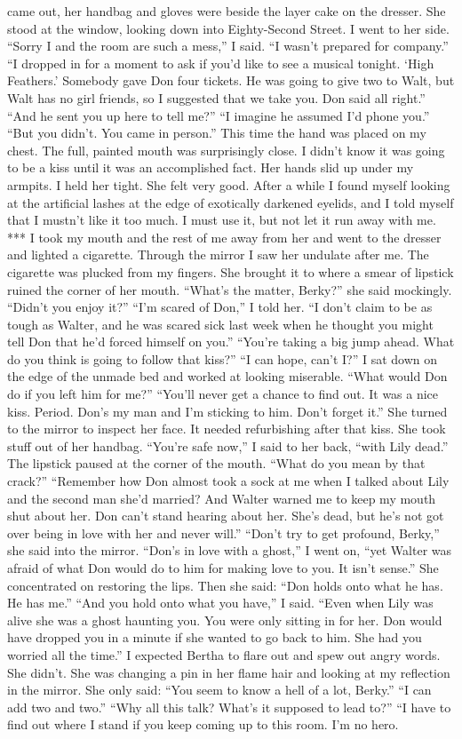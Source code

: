 \documentclass{novel}
\begin{document}
came out, her handbag and gloves were beside the layer cake on the dresser. She stood at the window, looking down into Eighty-Second Street. I went to her side. “Sorry I and the room are such a mess,” I said. “I wasn’t prepared for company.” “I dropped in for a moment to ask if you’d like to see a musical tonight. ‘High Feathers.’ Somebody gave Don four tickets. He was going to give two to Walt, but Walt has no girl friends, so I suggested that we take you. Don said all right.” “And he sent you up here to tell me?” “I imagine he assumed I’d phone you.” “But you didn’t. You came in person.” This time the hand was placed on my chest. The full, painted mouth was surprisingly close. I didn’t know it was going to be a kiss until it was an accomplished fact. Her hands slid up under my armpits. I held her tight. She felt very good. After a while I found myself looking at the artificial lashes at the edge of exotically darkened eyelids, and I told myself that I mustn’t like it too much. I must use it, but not let it run away with me. *** I took my mouth and the rest of me away from her and went to the dresser and lighted a cigarette. Through the mirror I saw her undulate after me. The cigarette was plucked from my fingers. She brought it to where a smear of lipstick ruined the corner of her mouth. “What’s the matter, Berky?” she said mockingly. “Didn’t you enjoy it?” “I’m scared of Don,” I told her. “I don’t claim to be as tough as Walter, and he was scared sick last week when he thought you might tell Don that he’d forced himself on you.” “You’re taking a big jump ahead. What do you think is going to follow that kiss?” “I can hope, can’t I?” I sat down on the edge of the unmade bed and worked at looking miserable. “What would Don do if you left him for me?” “You’ll never get a chance to find out. It was a nice kiss. Period. Don’s my man and I’m sticking to him. Don’t forget it.” She turned to the mirror to inspect her face. It needed refurbishing after that kiss. She took stuff out of her handbag. “You’re safe now,” I said to her back, “with Lily dead.” The lipstick paused at the corner of the mouth. “What do you mean by that crack?” “Remember how Don almost took a sock at me when I talked about Lily and the second man she’d married? And Walter warned me to keep my mouth shut about her. Don can’t stand hearing about her. She’s dead, but he’s not got over being in love with her and never will.” “Don’t try to get profound, Berky,” she said into the mirror. “Don’s in love with a ghost,” I went on, “yet Walter was afraid of what Don would do to him for making love to you. It isn’t sense.” She concentrated on restoring the lips. Then she said: “Don holds onto what he has. He has me.” “And you hold onto what you have,” I said. “Even when Lily was alive she was a ghost haunting you. You were only sitting in for her. Don would have dropped you in a minute if she wanted to go back to him. She had you worried all the time.” I expected Bertha to flare out and spew out angry words. She didn’t. She was changing a pin in her flame hair and looking at my reflection in the mirror. She only said: “You seem to know a hell of a lot, Berky.” “I can add two and two.” “Why all this talk? What’s it supposed to lead to?” “I have to find out where I stand if you keep coming up to this room. I’m no hero. 
\end{document}
